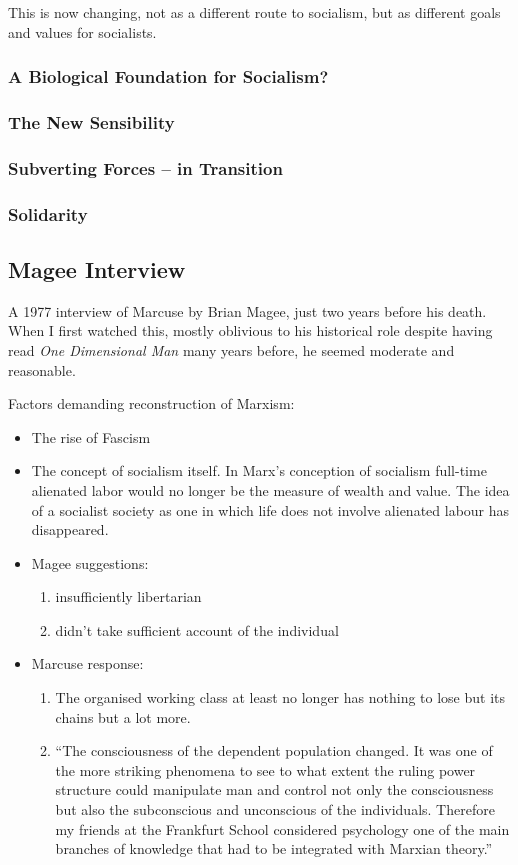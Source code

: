 \documentclass[10pt,titlepage]{book}
\begin{document}
This is now changing, not as a different route to socialism, but as different goals and values for socialists.


\subsubsection{A Biological Foundation for Socialism?}
\subsubsection{The New Sensibility}
\subsubsection{Subverting Forces – in Transition}
\subsubsection{Solidarity}

\subsection{Magee Interview \cite{marcuse-magee}}

A 1977 interview of Marcuse by Brian Magee, just two years before his death.
When I first watched this, mostly oblivious to his historical role despite having read \emph{One Dimensional Man} many years before, he seemed moderate and reasonable.

Factors demanding reconstruction of Marxism:

\begin{itemize}
\item The rise of Fascism
\item The concept of socialism itself.
  In Marx's conception of socialism full-time alienated labor would no longer be the measure of wealth and value.
  The idea of a socialist society as one in which life does not involve alienated labour has disappeared.
\item Magee suggestions:
  \begin{enumerate}
  \item insufficiently libertarian
    \item didn't take sufficient account of the individual
    \end{enumerate}
\item Marcuse response:
  \begin{enumerate}
  \item The organised working class at least no longer has nothing to lose but its chains but a lot more.
    \item ``The consciousness of
      the dependent population changed.
It was one of the more striking phenomena to see to what extent the ruling power
structure could manipulate man and control not only the consciousness
but also the subconscious and unconscious of the individuals.
Therefore my friends at the Frankfurt School considered psychology one of the main
branches of knowledge that had to be integrated with Marxian theory.''
    \end{enumerate}
\end{itemize}
\end{document}
